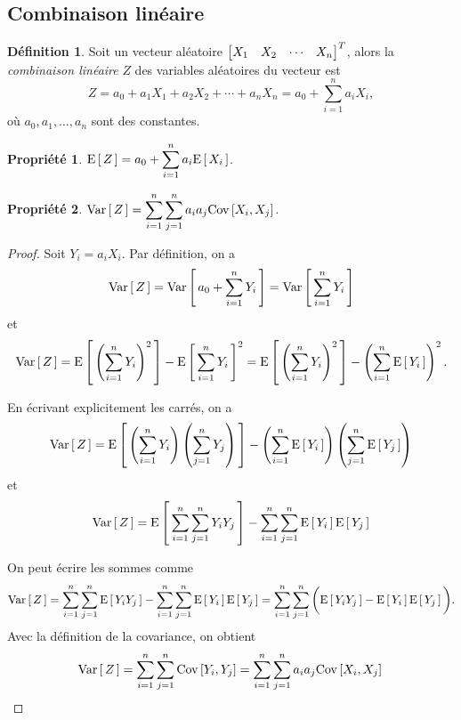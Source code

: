 \documentclass[11pt]{article}
\makeatletter
\newcommand\Esp[1]{%
	\ensuremath{%
		\mathrm{E}\left[\,#1\,\right]%
	}%
}%
\newcommand\Var[1]{%
	\ensuremath{%
		\mathrm{Var}\left[\,#1\,\right]%
	}%
}%
\newcommand\Cov[2]{%
	\ensuremath{%
		\mathrm{Cov}\left[#1,#2\right]%
	}%
}%
\newcommand\invec[1]{%
	\ensuremath{%
		\left[%
			\begin{matrix}%
				#1%
			\end{matrix}%
		\right]^T%
	}%
}%
\newtheorem{property}{Propriété}
\theoremstyle{remark}
\theoremstyle{definition}
\newtheorem*{@definition}{Définition}
\newenvironment{definition}{%
	\begin{@definition}%
}{%
	\end{@definition}%
	\setcounter{property}{0}%
}
\makeatother
\begin{document}
\subsection{Combinaison linéaire}
\begin{definition}
	Soit un vecteur aléatoire $\invec{X_1&X_2&\cdots&X_n}$, alors la
	\textit{combinaison linéaire} $Z$ des variables aléatoires du vecteur est
	\begin{equation*}
		Z=a_0+a_1X_1+a_2X_2+\cdots+a_nX_n=a_0+\sum_{i=1}^na_iX_i,
	\end{equation*}
	où $a_0,a_1,\dots,a_n$ sont des constantes.
\end{definition}

\begin{property}
	$\Esp{Z}=a_0+\displaystyle\sum_{i=1}^na_i\Esp{X_i}$.
\end{property}

\begin{property}
	$\Var{Z}=\displaystyle\sum_{i=1}^n\displaystyle\sum_{j=1}^na_ia_j
	\Cov{X_i}{X_j}$.
\end{property}

\begin{proof}
	Soit $Y_i=a_iX_i$. Par définition, on a
	\begin{equation*}
		\Var{Z}
		=\Var{a_0+\sum_{i=1}^nY_i}
		=\Var{\sum_{i=1}^nY_i}
	\end{equation*}
	et
	\begin{equation*}
		\Var{Z}
		=\Esp{\left(\sum_{i=1}^nY_i\right)^2}
		-\Esp{\sum_{i=1}^nY_i}^2
		=\Esp{\left(\sum_{i=1}^nY_i\right)^2}
		-\left(\sum_{i=1}^n\Esp{Y_i}\right)^2.
	\end{equation*}

	En écrivant explicitement les carrés, on a
	\begin{equation*}
		\Var{Z}
		=\Esp{\left(\sum_{i=1}^nY_i\right)\left(\sum_{j=1}^nY_j\right)}
		-\left(\sum_{i=1}^n\Esp{Y_i}\right)\left(\sum_{j=1}^n\Esp{Y_j}\right)
	\end{equation*}
	et
	\begin{equation*}
		\Var{Z}
		=\Esp{\sum_{i=1}^n\sum_{j=1}^nY_iY_j}
		-\sum_{i=1}^n\sum_{j=1}^n\Esp{Y_i}\Esp{Y_j}
	\end{equation*}

	On peut écrire les sommes comme
	\begin{equation*}
		\Var{Z}
		=\sum_{i=1}^n\sum_{j=1}^n\Esp{Y_iY_j}
		-\sum_{i=1}^n\sum_{j=1}^n\Esp{Y_i}\Esp{Y_j}
		=\sum_{i=1}^n\sum_{j=1}^n\bigg(\Esp{Y_iY_j}-\Esp{Y_i}\Esp{Y_j}\bigg).
	\end{equation*}
	Avec la définition de la covariance, on obtient
	\begin{equation*}
		\Var{Z}
		=\sum_{i=1}^n\sum_{j=1}^n\Cov{Y_i}{Y_j}
		=\sum_{i=1}^n\sum_{j=1}^na_ia_j\Cov{X_i}{X_j}\qedhere
	\end{equation*}
\end{proof}
\end{document}
